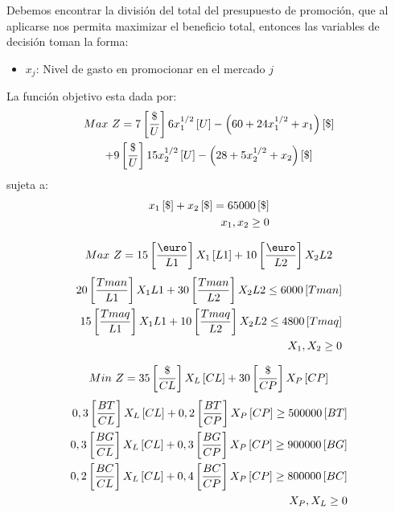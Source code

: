 \documentclass{tarea}
\begin{document}
\begin{homeworkProblem}
Debemos encontrar la división del total del presupuesto de promoción, que al aplicarse nos permita maximizar el beneficio total, entonces las variables de decisión toman la forma:
\begin{itemize}
  \item $x_j$: Nivel de gasto en promocionar en el mercado $j$
\end{itemize}
La función objetivo esta dada por:
\begin{multline}
  Max\ Z = 7\left[ \frac{\$}{U} \right]6x_1^{1/2}\left[ U \right] - \left( 60 +24x_1^{1/2}+x_1\right)\left[ \$ \right] \\ + 9\left[ \frac{\$}{U} \right]15x_2^{1/2}\left[ U \right] - \left( 28 +5x_2^{1/2}+x_2\right)\left[ \$ \right]
\end{multline}
sujeta a:
\begin{align*}
  x_1\left[ \$ \right] + x_2\left[ \$ \right] = 65000\left[ \$ \right] \\
  x_1,x_2 \ge 0
\end{align*}
\end{homeworkProblem}


\begin{homeworkProblem}
\begin{equation}
  Max\ Z = 15\fraccorche{\text{\euro}}{L1}X_1\corche{L1} +10\fraccorche{\text{\euro}}{L2}X_2{L2}
\end{equation}
\begin{align*}
  20\left[ \frac{Tman}{L1} \right]X_1{L1} + 30\left[ \frac{Tman}{L2} \right]X_2{L2} \le 6000\left[ Tman \right]\\
  15\left[ \frac{Tmaq}{L1} \right]X_1{L1} + 10\left[ \frac{Tmaq}{L2} \right]X_2{L2} \le 4800\left[ Tmaq \right]\\
  X_1,X_2 \ge 0
\end{align*}
\end{homeworkProblem}


\begin{homeworkProblem}
\begin{equation}
  Min\ Z = 35\left[ \frac{\$}{CL} \right]X_L\left[ CL \right] + 30\left[ \frac{\$}{CP} \right]X_P\left[ CP \right]
\end{equation}
\begin{align*}
   0,3\left[ \frac{BT}{CL} \right]X_L\left[ CL \right] + 0,2\left[ \frac{BT}{CP} \right]X_P\left[ CP \right] \ge 500000\left[ BT \right] \\
 0,3\left[ \frac{BG}{CL} \right]X_L\left[ CL \right] + 0,3\left[ \frac{BG}{CP} \right]X_P\left[ CP \right] \ge 900000\left[ BG \right] \\
 0,2\left[ \frac{BC}{CL} \right]X_L\left[ CL \right] + 0,4\left[ \frac{BC}{CP} \right]X_P\left[ CP \right] \ge 800000\left[ BC \right] \\
 X_P,X_L \ge 0
\end{align*}
\end{homeworkProblem}
\end{document}
